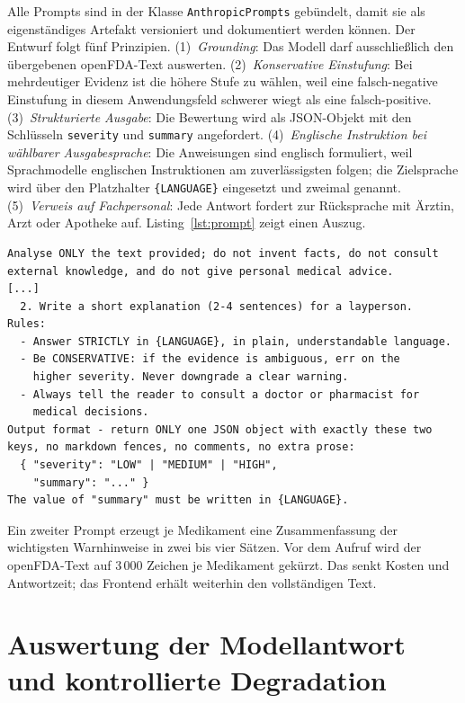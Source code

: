 Alle Prompts sind in der Klasse \texttt{AnthropicPrompts} gebündelt, damit sie als eigenständiges Artefakt versioniert und dokumentiert werden können. Der Entwurf folgt fünf Prinzipien. (1)~\emph{Grounding}: Das Modell darf ausschließlich den übergebenen openFDA-Text auswerten. (2)~\emph{Konservative Einstufung}: Bei mehrdeutiger Evidenz ist die höhere Stufe zu wählen, weil eine falsch-negative Einstufung in diesem Anwendungsfeld schwerer wiegt als eine falsch-positive. (3)~\emph{Strukturierte Ausgabe}: Die Bewertung wird als JSON-Objekt mit den Schlüsseln \texttt{severity} und \texttt{summary} angefordert. (4)~\emph{Englische Instruktion bei wählbarer Ausgabesprache}: Die Anweisungen sind englisch formuliert, weil Sprachmodelle englischen Instruktionen am zuverlässigsten folgen; die Zielsprache wird über den Platzhalter \texttt{\{LANGUAGE\}} eingesetzt und zweimal genannt. (5)~\emph{Verweis auf Fachpersonal}: Jede Antwort fordert zur Rücksprache mit Ärztin, Arzt oder Apotheke auf. Listing~\ref{lst:prompt} zeigt einen Auszug.

\begin{lstlisting}[float=htbp, caption={Auszug aus dem System-Prompt für die Bewertung einer Kombination.}, label={lst:prompt}]
Analyse ONLY the text provided; do not invent facts, do not consult
external knowledge, and do not give personal medical advice.
[...]
  2. Write a short explanation (2-4 sentences) for a layperson.
Rules:
  - Answer STRICTLY in {LANGUAGE}, in plain, understandable language.
  - Be CONSERVATIVE: if the evidence is ambiguous, err on the
    higher severity. Never downgrade a clear warning.
  - Always tell the reader to consult a doctor or pharmacist for
    medical decisions.
Output format - return ONLY one JSON object with exactly these two
keys, no markdown fences, no comments, no extra prose:
  { "severity": "LOW" | "MEDIUM" | "HIGH",
    "summary": "..." }
The value of "summary" must be written in {LANGUAGE}.
\end{lstlisting}

Ein zweiter Prompt erzeugt je Medikament eine Zusammenfassung der wichtigsten Warnhinweise in zwei bis vier Sätzen. Vor dem Aufruf wird der openFDA-Text auf 3\,000 Zeichen je Medikament gekürzt. Das senkt Kosten und Antwortzeit; das Frontend erhält weiterhin den vollständigen Text.

\section{Auswertung der Modellantwort und kontrollierte Degradation}

